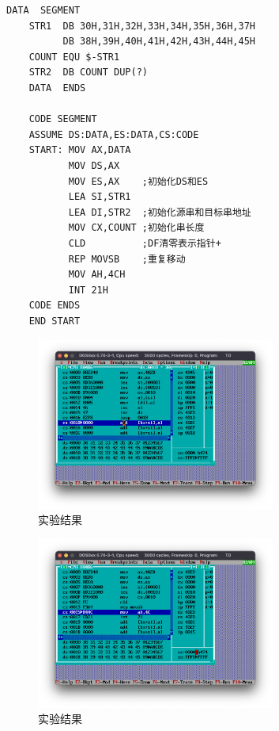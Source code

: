 \documentclass[11pt]{SEU-Digital-Report}
\begin{document}
\begin{lstlisting}[language={[x86masm]Assembler},title=exp352.asm]
    DATA  SEGMENT
    STR1  DB 30H,31H,32H,33H,34H,35H,36H,37H
          DB 38H,39H,40H,41H,42H,43H,44H,45H
    COUNT EQU $-STR1
    STR2  DB COUNT DUP(?)    
    DATA  ENDS
    
    CODE SEGMENT    
    ASSUME DS:DATA,ES:DATA,CS:CODE
    START: MOV AX,DATA
           MOV DS,AX    
           MOV ES,AX    ;初始化DS和ES
           LEA SI,STR1
           LEA DI,STR2  ;初始化源串和目标串地址
           MOV CX,COUNT ;初始化串长度
           CLD          ;DF清零表示指针+
           REP MOVSB    ;重复移动
           MOV AH,4CH
           INT 21H
    CODE ENDS
    END START    
\end{lstlisting}

\begin{figure}[htbp]
    \centering
    \includegraphics[width=0.7\textwidth]{fig/rlt5.png}
    \caption{实验结果}
    \label{fig:rlt5}
\end{figure}

\begin{figure}[htbp]
    \centering
    \includegraphics[width=0.7\textwidth]{fig/rlt55.png}
    \caption{实验结果}
    \label{fig:rlt55}
\end{figure}
\end{document}
